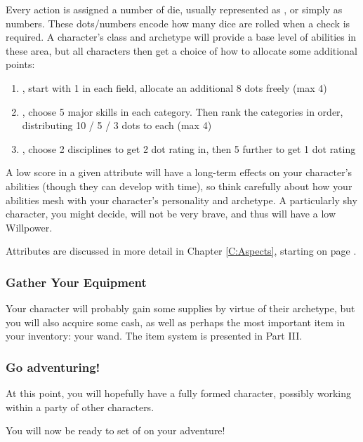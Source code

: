 Every action is assigned a number of die, usually represented as , or simply as numbers. These dots/numbers encode how many dice are rolled when a check is required. A character's class and archetype will provide a base level of abilities in these area, but all characters then get a choice of how to allocate some additional points:


\begin{enumerate}
\item {}, start with 1 in each field, allocate an additional 8 dots freely (max 4)
\item {}, choose 5 major skills in each category. Then rank the categories in order, distributing 10 / 5 / 3 dots to each (max 4)  
\item {}, choose 2 disciplines to get 2 dot rating in, then 5 further to get 1 dot rating
\end{enumerate} 

A low score in a given attribute will have a long-term effects on your character's abilities (though they can develop with time), so think carefully about how your abilities mesh with your character's personality and archetype. A particularly shy character, you might decide, will not be very brave, and thus will have a low Willpower. 

Attributes are discussed in more detail in Chapter \ref{C:Aspects}, starting on page \pageref{C:Aspects}.

\subsubsection*{\itemlist{} Gather Your Equipment}

Your character will probably gain some supplies by virtue of their archetype, but you will also acquire some cash, as well as perhaps the most important item in your inventory: your wand. The item system is presented in Part III.

\subsubsection*{\itemlist{} Go adventuring!}

At this point, you will hopefully have a fully formed character, possibly working within a party of other characters. 

You will now be ready to set of on your adventure!

